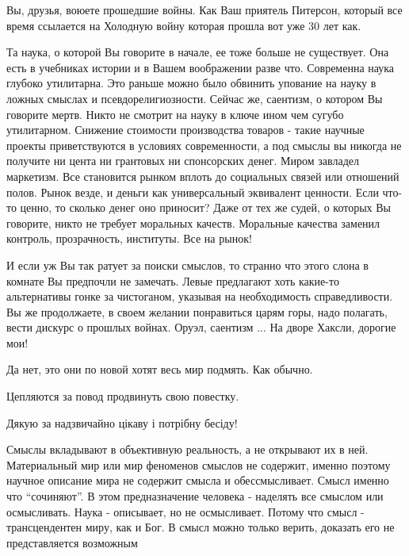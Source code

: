 \begin{multicols}{2}

Вы, друзья, воюете прошедшие войны. Как Ваш приятель Питерсон, который все
время ссылается на Холодную войну которая прошла вот уже 30 лет как. 

Та наука, о которой Вы говорите в начале, ее тоже больше не существует. Она
есть в учебниках истории и в Вашем воображении разве что. Современна наука
глубоко утилитарна. Это раньше можно было обвинить упование на науку в ложных
смыслах и псевдорелигиозности. Сейчас же, саентизм, о котором Вы говорите
мертв. Никто не смотрит на науку в ключе ином чем сугубо утилитарном. Снижение
стоимости производства товаров - такие научные проекты приветствуются в
условиях современности, а под смыслы вы никогда не получите ни цента ни
грантовых ни спонсорских денег. Миром завладел маркетизм. Все становится рынком
вплоть до социальных связей или отношений полов. Рынок везде, и деньги как
универсальный эквивалент ценности. Если что-то ценно, то сколько денег оно
приносит? Даже от тех же судей, о которых Вы говорите, никто не требует
моральных качеств. Моральные качества заменил контроль, прозрачность,
институты. Все на рынок! 

И если уж Вы так ратует за поиски смыслов, то странно что этого слона в комнате
Вы предпочли не замечать. Левые предлагают хоть какие-то альтернативы гонке за
чистоганом, указывая на необходимость справедливости. Вы же продолжаете, в
своем желании понравиться царям горы, надо полагать, вести дискурс о прошлых
войнах. Оруэл, саентизм ... На дворе Хаксли, дорогие мои!

\begin{itemize} %
Да нет, это они по новой хотят весь мир подмять. Как обычно.

Цепляются за повод продвинуть свою повестку.
\end{itemize} %

Дякую за надзвичайно цікаву і потрібну бесіду!


Смыслы вкладывают в объективную реальность, а не открывают их в ней.
Материальный мир  или мир феноменов смыслов не содержит, именно поэтому научное
описание мира не содержит смысла и обессмысливает. Смысл именно что \enquote{сочиняют}.
В этом предназначение человека - наделять все смыслом или осмысливать. Наука -
описывает, но не осмысливает. Потому что смысл - трансцендентен миру, как и
Бог. В смысл можно только верить, доказать его не представляется возможным


\end{multicols}
